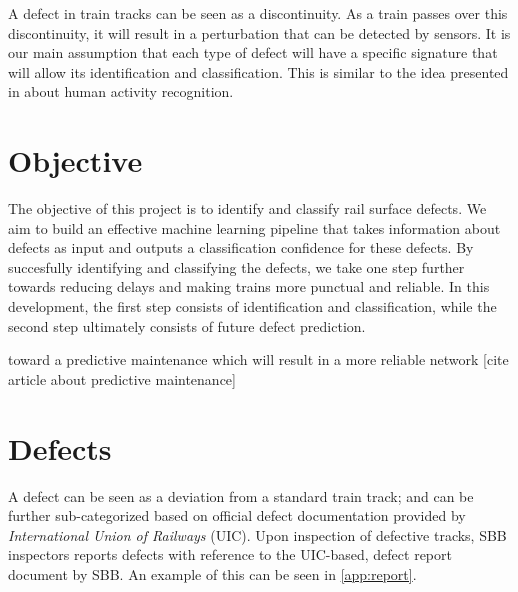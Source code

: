 A defect in train tracks can be seen as a discontinuity. As a train passes over this discontinuity, it will result in a perturbation that can be detected by sensors. It is our main assumption that each type of defect will have a specific signature that will allow its identification and classification. This is similar to the idea presented in \cite{Introduc31:online} about human activity recognition.

\section{Objective}
The objective of this project is to identify and classify rail surface defects. We aim to build an effective machine learning pipeline that takes information about defects as input and outputs a classification confidence for these defects. By succesfully identifying and classifying the defects, we take one step further towards reducing delays and making trains more punctual and reliable. In this development, the first step consists of identification and classification, while the second step ultimately consists of future defect prediction. 

toward a predictive maintenance which will result in a more reliable network [cite article about predictive maintenance]
\section{Defects}
A defect can be seen as a deviation from a standard train track; and can be further sub-categorized based on official defect documentation \cite{rail:online} provided by \textit{International Union of Railways} (UIC). Upon inspection of defective tracks, SBB inspectors reports defects with reference to the UIC-based, defect report document by SBB. An example of this can be seen in \ref{app:report}.

